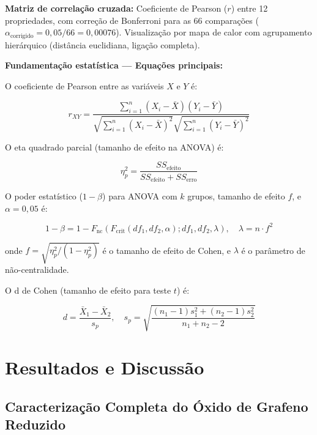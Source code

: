 \documentclass[12pt,a4paper,twoside]{article}
\begin{document}
\textbf{Matriz de correlação cruzada:} Coeficiente de Pearson ($r$) entre 12 propriedades, com correção de Bonferroni para as 66 comparações ($\alpha_{\text{corrigido}} = 0,05/66 = 0,00076$). Visualização por mapa de calor com agrupamento hierárquico (distância euclidiana, ligação completa).

\textbf{Fundamentação estatística — Equações principais:}

O coeficiente de Pearson entre as variáveis $X$ e $Y$ é:

\begin{equation}
r_{XY} = \frac{\sum_{i=1}^{n} (X_i - \bar{X})(Y_i - \bar{Y})}{\sqrt{\sum_{i=1}^{n} (X_i - \bar{X})^2} \sqrt{\sum_{i=1}^{n} (Y_i - \bar{Y})^2}}
\label{eq:pearson}
\end{equation}

O eta quadrado parcial (tamanho de efeito na ANOVA) é:

\begin{equation}
\eta^2_p = \frac{SS_{\text{efeito}}}{SS_{\text{efeito}} + SS_{\text{erro}}}
\label{eq:eta2}
\end{equation}

O poder estatístico ($1-\beta$) para ANOVA com $k$ grupos, tamanho de efeito $f$, e $\alpha = 0,05$ é:

\begin{equation}
1-\beta = 1 - F_{\text{nc}}\left(F_{\text{crit}}(df_1, df_2, \alpha); df_1, df_2, \lambda\right), \quad \lambda = n \cdot f^2
\label{eq:power}
\end{equation}

onde $f = \sqrt{\eta^2_p / (1 - \eta^2_p)}$ é o tamanho de efeito de Cohen, e $\lambda$ é o parâmetro de não-centralidade.

O d de Cohen (tamanho de efeito para teste $t$) é:

\begin{equation}
d = \frac{\bar{X}_1 - \bar{X}_2}{s_p}, \quad s_p = \sqrt{\frac{(n_1-1)s_1^2 + (n_2-1)s_2^2}{n_1 + n_2 - 2}}
\label{eq:d_cohen}
\end{equation}

\section{Resultados e Discussão}

\subsection{Caracterização Completa do Óxido de Grafeno Reduzido}
\end{document}
